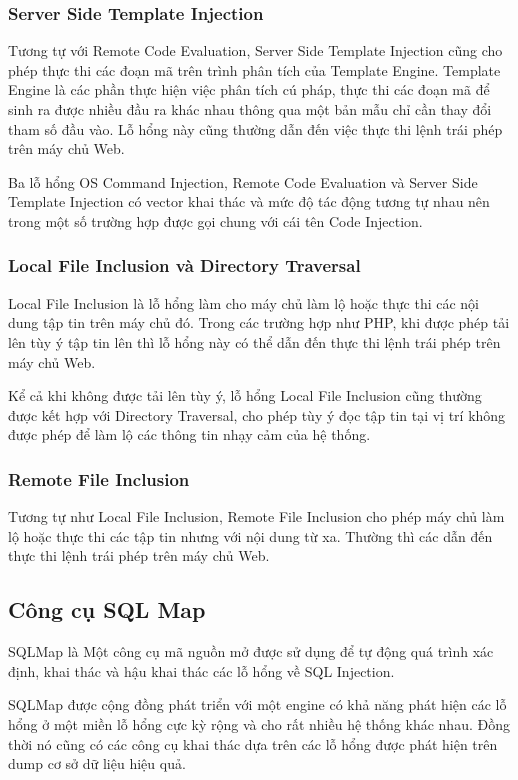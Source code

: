 \documentclass[./../main.tex]{subfiles}
\begin{document}
\subsubsection{Server Side Template Injection}
Tương tự với Remote Code Evaluation, Server Side Template Injection cũng
cho phép thực thi các đoạn mã trên trình phân tích của Template Engine.
Template Engine là các phần thực hiện việc phân tích cú pháp, thực thi
các đoạn mã để sinh ra được nhiều đầu ra khác nhau thông qua một bản mẫu
chỉ cần thay đổi tham số đầu vào. Lỗ hổng này cũng thường dẫn đến việc thực
thi lệnh trái phép trên máy chủ Web.

Ba lỗ hổng OS Command Injection, Remote Code Evaluation và Server Side Template Injection
có vector khai thác và mức độ tác động tương tự nhau nên trong một số trường hợp
được gọi chung với cái tên Code Injection.

\subsubsection{Local File Inclusion và Directory Traversal}
Local File Inclusion là lỗ hổng làm cho máy chủ làm lộ hoặc thực thi các
nội dung tập tin trên máy chủ đó. Trong các trường hợp như PHP, khi được
phép tải lên tùy ý tập tin lên thì lỗ hổng này có thể dẫn đến thực thi lệnh
trái phép trên máy chủ Web.

Kể cả khi không được tải lên tùy ý, lỗ hổng Local File Inclusion cũng
thường được kết hợp với Directory Traversal, cho phép tùy ý đọc tập tin
tại vị trí không được phép để làm lộ các thông tin nhạy cảm của hệ thống.

\subsubsection{Remote File Inclusion}

Tương tự như Local File Inclusion, Remote File Inclusion cho phép máy chủ
làm lộ hoặc thực thi các tập tin nhưng với nội dung từ xa. Thường thì các
dẫn đến thực thi lệnh trái phép trên máy chủ Web.

\subsection{Công cụ SQL Map}
SQLMap là Một công cụ mã nguồn mở được sử dụng để tự động quá trình xác
định, khai thác và hậu khai thác các lỗ hổng về SQL Injection.

SQLMap được cộng đồng phát triển với một engine có khả năng phát hiện các
lỗ hổng ở một miền lỗ hổng cực kỳ rộng và cho rất nhiều hệ thống khác nhau.
Đồng thời nó cũng có các công cụ khai thác dựa trên các lỗ hổng được phát
hiện trên dump cơ sở dữ liệu hiệu quả.
\end{document}
